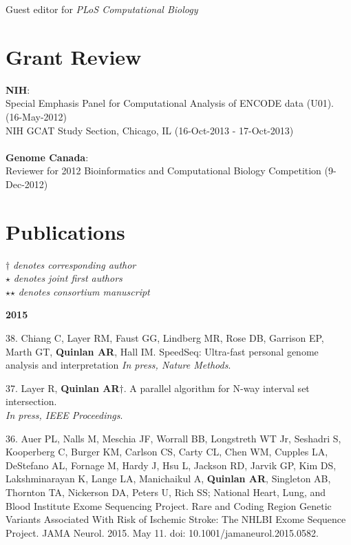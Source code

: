 \documentclass[margin,line]{cv}
\begin{document}
\begin{resume}
    Guest editor for \textit{PLoS Computational Biology}

    \section{\mysidestyle Grant Review}
    \textbf{NIH}:
    \\
    Special Emphasis Panel for Computational Analysis of ENCODE data (U01). (16-May-2012)\\%
    NIH GCAT Study Section, Chicago, IL (16-Oct-2013 - 17-Oct-2013)%
    \\
    \\
    \textbf{Genome Canada}:
    \\
    Reviewer for 2012 Bioinformatics and Computational Biology Competition (9-Dec-2012)

    \section{\mysidestyle Publications}
    $\dagger$\textit{ denotes corresponding author}\\
    $\star$\textit{ denotes joint first authors}\\
    $\star$$\star$\textit{ denotes consortium manuscript}


    \textbf{2015} \\

    \begin{list}{*}{}

    \item[38.] Chiang C, Layer RM, Faust GG, Lindberg MR, Rose DB, Garrison EP, Marth GT, \textbf{Quinlan AR}, Hall IM.
    SpeedSeq: Ultra-fast personal genome analysis and interpretation
    \emph{In press, Nature Methods}.

    \item[37.] Layer R, \textbf{Quinlan AR}$\dagger$.
    A parallel algorithm for N-way interval set intersection.\\
    \emph{In press, IEEE Proceedings}.

    \item[36.] Auer PL, Nalls M, Meschia JF, Worrall BB, Longstreth WT Jr, Seshadri S, Kooperberg C, Burger KM, Carlson CS,
    Carty CL, Chen WM, Cupples LA, DeStefano AL, Fornage M, Hardy J, Hsu L, Jackson RD, Jarvik GP, Kim DS,
    Lakshminarayan K, Lange LA, Manichaikul A,  \textbf{Quinlan AR}, Singleton AB, Thornton TA,
    Nickerson DA, Peters U, Rich SS; National Heart, Lung, and Blood Institute Exome Sequencing Project.
    Rare and Coding Region Genetic Variants Associated With Risk of Ischemic Stroke: The NHLBI Exome Sequence Project.
    JAMA Neurol. 2015. May 11. doi: 10.1001/jamaneurol.2015.0582.


\end{list}
\end{resume}
\end{document}
